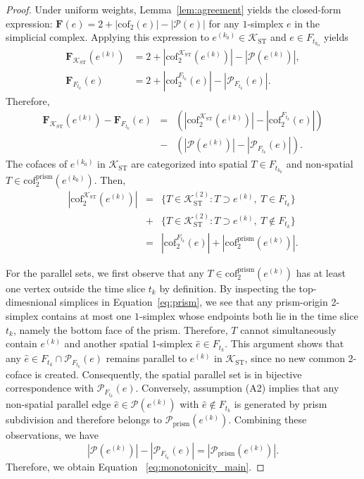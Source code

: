 \documentclass[
    pre,
    twocolumn,
    superscriptaddress,
    showpacs,
    nofootinbib,
    amsmath,
    amssymb,
    floatfix
]{revtex4-2}
\newcommand{\K}{\mathcal{K}}
\newcommand{\F}{\mathbf{F}}        %
\theoremstyle{plain} %
\theoremstyle{definition} %
\begin{document}
\begin{proof}
Under uniform weights, Lemma~\ref{lem:agreement} yields the closed-form expression:
$\F(e) = 2 + |\mathrm{cof}_2(e)| - |\mathcal{P}(e)|$ for any $1$-simplex $e$ in the simplicial complex.
Applying this expression to $e^{(k_0)} \in \K_{\mathrm{ST}}$ and $e \in F_{t_{k_0}}$ yields
\begin{align*}
\F_{\K_{\mathrm{ST}}}(e^{(k)}) &= 2 + |\mathrm{cof}_2^{\K_{\mathrm{ST}}}(e^{(k)})| - |\mathcal{P}(e^{(k)})|, \\
\F_{F_{t_k}}(e) &= 2 + |\mathrm{cof}_2^{F_{t_k}}(e)| - |\mathcal{P}_{F_{t_k}}(e)|.
\end{align*}
Therefore,
\begin{eqnarray}\label{eq:result_step1}
\F_{\K_{\mathrm{ST}}}(e^{(k)}) - \F_{F_{t_{k}}}(e) &=& (|\mathrm{cof}_2^{\K_{\mathrm{ST}}}(e^{(k)})| - |\mathrm{cof}_2^{F_{t_k}}(e)|)\nonumber\\
&-& (|\mathcal{P}(e^{(k)})| - |\mathcal{P}_{F_{t_k}}(e)|).
\end{eqnarray}
The cofaces of $e^{(k_0)}$ in $\K_{\mathrm{ST}}$ are categorized into spatial $T \in F_{t_{k_0}}$ and non-spatial $T \in \mathrm{cof}_2^{\mathrm{prism}}(e^{(k_0)})$. Then,
\begin{eqnarray*}
|\mathrm{cof}_2^{\K_{\mathrm{ST}}}(e^{(k)})| &=& \{T \in \K_{\mathrm{ST}}^{(2)} : T \supset e^{(k)},\ T \in F_{t_k}\}\\
&+& \{T \in \K_{\mathrm{ST}}^{(2)} : T \supset e^{(k)},\ T \notin F_{t_k}\}\\
&=& |\mathrm{cof}_2^{F_{t_k}}(e)| + |\mathrm{cof}_2^{\mathrm{prism}}(e^{(k)})|.
\end{eqnarray*}

For the parallel sets, we first observe  that any $T \in \mathrm{cof}_2^{\mathrm{prism}}(e^{(k)})$ has at least one vertex outside the time slice $t_k$ by definition.
By inspecting the top-dimesnional simplices in Equation~\eqref{eq:prism}, we see that any prism-origin 2-simplex contains at most one $1$-simplex whose endpoints both lie in the time slice $t_k$, namely the bottom face of the prism.
Therefore, $T$ cannot simultaneously contain $e^{(k)}$ and another spatial $1$-simplex $\hat e \in F_{t_k}$.
This argument shows that any $\hat e \in F_{t_k} \cap \mathcal{P}_{F_{t_k}}(e)$ remains parallel to $e^{(k)}$ in $\K_{\mathrm{ST}}$, since no new common 2-coface is created. Consequently, the spatial parallel set is in bijective correspondence with $\mathcal{P}_{F_{t_k}}(e)$.
Conversely, assumption (A2) implies that any non-spatial parallel edge $\hat e \in \mathcal{P}(e^{(k)})$ with $\hat e \notin F_{t_k}$ is generated by prism subdivision and therefore belongs to $\mathcal{P}_{\mathrm{prism}}(e^{(k)})$.
Combining these observations, we have
\begin{equation*}
|\mathcal{P}(e^{(k)})| - |\mathcal{P}_{F_{t_k}}(e)| = |\mathcal{P}_{\mathrm{prism}}(e^{(k)})|.
\end{equation*}
Therefore, we obtain Equation ~\eqref{eq:monotonicity_main}.


\end{proof}
\end{document}
